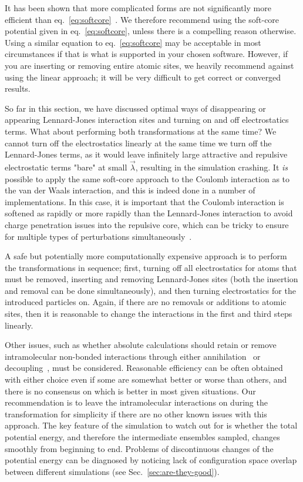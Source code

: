 \documentclass[9pt,bestpractices,pubversion]{livecoms}
\begin{document}
It has been shown that more complicated forms are not significantly more efficient than eq.~\ref{eq:softcore}~\cite{pham2012optimal}. We therefore recommend using the soft-core potential given in eq.~\ref{eq:softcore}, unless there is a compelling reason otherwise. Using a similar equation to eq.~\ref{eq:softcore} may be acceptable in most circumstances if that is what is supported in your chosen software. However, if you are inserting or removing entire atomic sites, we heavily recommend against using the linear approach; it will be very difficult to get correct or converged results. 

So far in this section, we have discussed optimal ways of disappearing or appearing Lennard-Jones interaction sites and turning on and off electrostatics terms. What about performing both transformations at the same time? We cannot turn off the electrostatics linearly at the same time we turn off the Lennard-Jones terms, as it would leave infinitely large attractive and repulsive electrostatic terms "bare" at small $\vec{\lambda}$, resulting in the simulation crashing. It \textit{is} possible to apply the same soft-core approach to the Coulomb interaction as to the van der Waals interaction, and this is indeed done in a number of implementations. In this case, it is important that the Coulomb interaction is softened as rapidly or more rapidly than the Lennard-Jones interaction to avoid charge penetration issues into the repulsive core, which  can be tricky to ensure for multiple types of perturbations simultaneously~\cite{steinbrecher2011softcore}. 

A safe but potentially more computationally expensive approach is to perform the transformations in sequence; first, turning off all electrostatics for atoms that must be removed, inserting and removing Lennard-Jones sites (both the insertion and removal can be done simultaneously), and then turning electrostatics for the introduced particles on. Again, if there are no removals or additions to atomic sites, then it is reasonable to change the interactions in the first and third steps  linearly. 

Other issues, such as whether absolute calculations should retain or remove intramolecular non-bonded interactions
through either annihilation~\cite{hermans1997inclusion, mann2000modeling, boresch2003absolute, wang2006absolute, mobley2006use} or decoupling~\cite{fujitani2005direct, mobley2006use}, must be considered. Reasonable efficiency can be often obtained with either choice even if some are somewhat better or worse than others, and there is no consensus on which is better in most given situations. Our recommendation is to leave the intramolecular interactions on during the transformation for simplicity if there are no other known issues with this approach. The key feature of the simulation to watch out for is whether the total potential energy, and therefore the intermediate ensembles sampled, changes smoothly from beginning to end. Problems of discontinuous changes of the potential energy can be diagnosed by noticing lack of configuration space overlap between different simulations (see Sec.~\ref{sec:are-they-good}).
\end{document}
